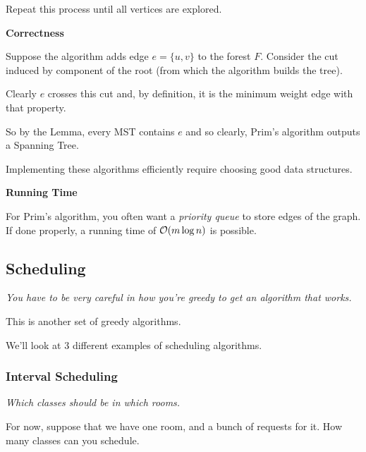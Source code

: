 \documentclass[12pt]{article}
\begin{document}
  Repeat this process until all vertices are explored.

  {\bf Correctness}

  {
    Suppose the algorithm adds edge $e = \{u, v\}$ to the forest $F$. Consider the
    cut induced by component of the root (from which the algorithm builds the
    tree).

    Clearly $e$ crosses this cut and, by definition, it is the minimum weight edge
    with that property.

    So by the Lemma, every MST contains $e$ and so clearly, Prim's algorithm
    outputs a Spanning Tree.
  }


  Implementing these algorithms efficiently require choosing good data structures.

  {\bf Running Time}

  For Prim's algorithm, you often want a {\it priority queue} to store edges of
  the graph. If done properly, a running time of $\mathcal O(m\log n)$ is possible.

  \subsection{Scheduling}


  {\it You have to be very careful in how you're greedy to get an algorithm that
  works.}

  This is another set of greedy algorithms.


  We'll look at 3 different examples of scheduling algorithms.

  \subsubsection{Interval Scheduling}

  {\it Which classes should be in which rooms.}

  For now, suppose that we have one room, and a bunch of requests for it. How many
  classes can you schedule.
\end{document}
